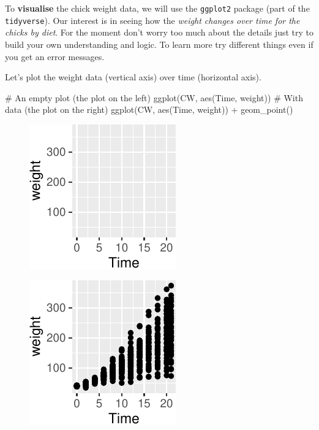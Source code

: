 \documentclass[
  letterpaper,
  DIV=11,
  numbers=noendperiod]{scrreprt}
\newenvironment{Shaded}{\begin{snugshade}}{\end{snugshade}}
\newcommand{\CommentTok}[1]{\textcolor[rgb]{0.37,0.37,0.37}{#1}}
\newcommand{\FunctionTok}[1]{\textcolor[rgb]{0.28,0.35,0.67}{#1}}
\newcommand{\NormalTok}[1]{\textcolor[rgb]{0.00,0.23,0.31}{#1}}
\newcommand{\SpecialCharTok}[1]{\textcolor[rgb]{0.37,0.37,0.37}{#1}}
\theoremstyle{definition}
\theoremstyle{plain}
\theoremstyle{plain}
\theoremstyle{remark}
\begin{document}
To \textbf{visualise} the chick weight data, we will use the
\texttt{ggplot2} package (part of the \texttt{tidyverse}). Our interest
is in seeing how the \emph{weight changes over time for the chicks by
diet}. For the moment don't worry too much about the details just try to
build your own understanding and logic. To learn more try different
things even if you get an error messages.

Let's plot the weight data (vertical axis) over time (horizontal axis).

\begin{Shaded}
\begin{Highlighting}[]
\CommentTok{\# An empty plot (the plot on the left)}
\FunctionTok{ggplot}\NormalTok{(CW, }\FunctionTok{aes}\NormalTok{(Time, weight))  }
\CommentTok{\# With data (the plot on the right)}
\FunctionTok{ggplot}\NormalTok{(CW, }\FunctionTok{aes}\NormalTok{(Time, weight)) }\SpecialCharTok{+} \FunctionTok{geom\_point}\NormalTok{() }
\end{Highlighting}
\end{Shaded}

\begin{figure}[H]

{\centering \includegraphics{./01-Introduction-to-R_files/figure-pdf/emptyPlot-1.pdf}

}

\end{figure}

\begin{figure}[H]

{\centering \includegraphics{./01-Introduction-to-R_files/figure-pdf/emptyPlot-2.pdf}

}

\end{figure}
\end{document}
